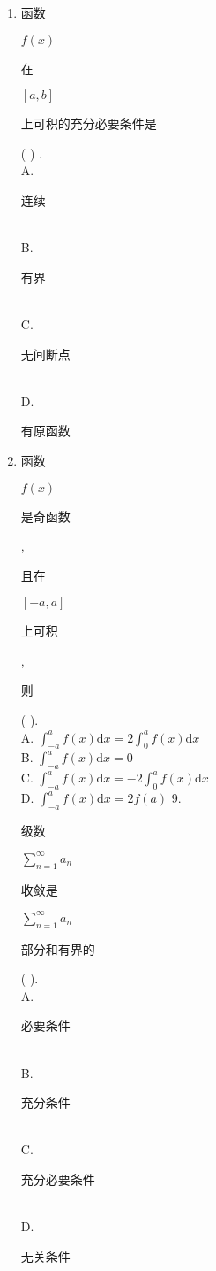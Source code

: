 \documentclass[10pt]{article}
\begin{document}
\begin{enumerate}
  \item \begin{CJK}{UTF8}{mj}函数\end{CJK} $f(x)$ \begin{CJK}{UTF8}{mj}在\end{CJK} $[a, b]$ \begin{CJK}{UTF8}{mj}上可积的充分必要条件是\end{CJK} ( ) .\\
A. \begin{CJK}{UTF8}{mj}连续\end{CJK}\\
B. \begin{CJK}{UTF8}{mj}有界\end{CJK}\\
C. \begin{CJK}{UTF8}{mj}无间断点\end{CJK}\\
D. \begin{CJK}{UTF8}{mj}有原函数\end{CJK}

  \item \begin{CJK}{UTF8}{mj}函数\end{CJK} $f(x)$ \begin{CJK}{UTF8}{mj}是奇函数\end{CJK}, \begin{CJK}{UTF8}{mj}且在\end{CJK} $[-a, a]$ \begin{CJK}{UTF8}{mj}上可积\end{CJK}, \begin{CJK}{UTF8}{mj}则\end{CJK} ( ).\\
A. $\int_{-a}^{a} f(x) \mathrm{d} x=2 \int_{0}^{a} f(x) \mathrm{d} x$\\
B. $\int_{-a}^{a} f(x) \mathrm{d} x=0$\\
C. $\int_{-a}^{a} f(x) \mathrm{d} x=-2 \int_{0}^{a} f(x) \mathrm{d} x$\\
D. $\int_{-a}^{a} f(x) \mathrm{d} x=2 f(a)$ 9. \begin{CJK}{UTF8}{mj}级数\end{CJK} $\sum_{n=1}^{\infty} a_{n}$ \begin{CJK}{UTF8}{mj}收敛是\end{CJK} $\sum_{n=1}^{\infty} a_{n}$ \begin{CJK}{UTF8}{mj}部分和有界的\end{CJK} ( ).\\
A. \begin{CJK}{UTF8}{mj}必要条件\end{CJK}\\
B. \begin{CJK}{UTF8}{mj}充分条件\end{CJK}\\
C. \begin{CJK}{UTF8}{mj}充分必要条件\end{CJK}\\
D. \begin{CJK}{UTF8}{mj}无关条件\end{CJK}


\end{enumerate}
\end{document}
